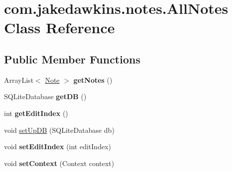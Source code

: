 \hypertarget{classcom_1_1jakedawkins_1_1notes_1_1_all_notes}{}\section{com.\+jakedawkins.\+notes.\+All\+Notes Class Reference}
\label{classcom_1_1jakedawkins_1_1notes_1_1_all_notes}
\subsection*{Public Member Functions}
\begin{DoxyCompactItemize}
\item 
Array\+List$<$ \hyperlink{classcom_1_1jakedawkins_1_1notes_1_1_note}{Note} $>$ {\bfseries get\+Notes} ()\hypertarget{classcom_1_1jakedawkins_1_1notes_1_1_all_notes_a05ecf5ae85a83a06dc79a53164baef33}{}\label{classcom_1_1jakedawkins_1_1notes_1_1_all_notes_a05ecf5ae85a83a06dc79a53164baef33}

\item 
S\+Q\+Lite\+Database {\bfseries get\+DB} ()\hypertarget{classcom_1_1jakedawkins_1_1notes_1_1_all_notes_a65f8d4eb7450a8eb0c40999927247278}{}\label{classcom_1_1jakedawkins_1_1notes_1_1_all_notes_a65f8d4eb7450a8eb0c40999927247278}

\item 
int {\bfseries get\+Edit\+Index} ()\hypertarget{classcom_1_1jakedawkins_1_1notes_1_1_all_notes_af3ed3c2fc66a386f2aa754e042138ba2}{}\label{classcom_1_1jakedawkins_1_1notes_1_1_all_notes_af3ed3c2fc66a386f2aa754e042138ba2}

\item 
void \hyperlink{classcom_1_1jakedawkins_1_1notes_1_1_all_notes_a5d9c47ea94857ade8b12afbbcfb1cf59}{set\+Up\+DB} (S\+Q\+Lite\+Database db)
\item 
void {\bfseries set\+Edit\+Index} (int edit\+Index)\hypertarget{classcom_1_1jakedawkins_1_1notes_1_1_all_notes_a5d72f57021275e9e5e992d14edc705b5}{}\label{classcom_1_1jakedawkins_1_1notes_1_1_all_notes_a5d72f57021275e9e5e992d14edc705b5}

\item 
void {\bfseries set\+Context} (Context context)\hypertarget{classcom_1_1jakedawkins_1_1notes_1_1_all_notes_afd32cd5d762c4f45b5159e80c9a9a532}{}\label{classcom_1_1jakedawkins_1_1notes_1_1_all_notes_afd32cd5d762c4f45b5159e80c9a9a532}


\end{DoxyCompactItemize}
